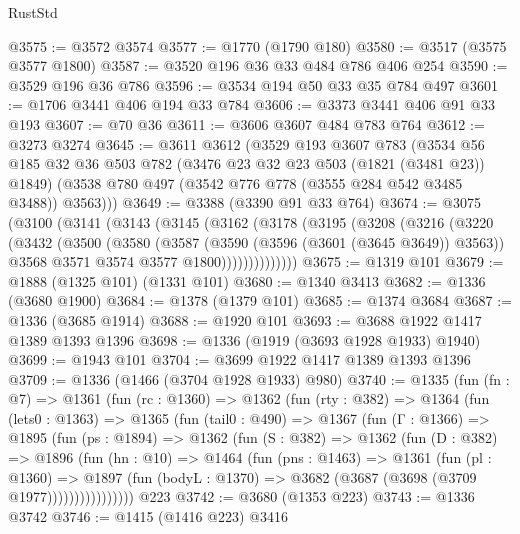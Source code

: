 \begin{lexlean}{RustStd}
\begin{coremodule}
{\begin{coremodule}
{{{{{{{{{{{{{{@3575 := @3572 @3574
@3577 := @1770 (@1790 @180)
@3580 := @3517 (@3575 @3577 @1800)
@3587 := @3520 @196 @36 @33 @484 @786 @406 @254
@3590 := @3529 @196 @36 @786
@3596 := @3534 @194 @50 @33 @35 @784 @497
@3601 := @1706 @3441 @406 @194 @33 @784
@3606 := @3373 @3441 @406 @91 @33 @193
@3607 := @70 @36
@3611 := @3606 @3607 @484 @783 @764
@3612 := @3273 @3274
@3645 := @3611
    @3612
    (@3529
      @193
      @3607
      @783
      (@3534
        @56
        @185
        @32
        @36
        @503
        @782
        (@3476 @23 @32 @23 @503 (@1821 (@3481 @23)) @1849)
        (@3538 @780 @497 (@3542 @776 @778 (@3555 @284 @542 @3485 @3488)) @3563)))
@3649 := @3388 (@3390 @91 @33 @764)
@3674 := @3075
    (@3100
      (@3141
        (@3143
          (@3145
            (@3162
              (@3178
                (@3195
                  (@3208
                    (@3216
                      (@3220
                        (@3432
                          (@3500
                            (@3580
                              (@3587
                                (@3590 (@3596 (@3601 (@3645 @3649)) @3563))
                                @3568
                                @3571
                                @3574
                                @3577
                                @1800))))))))))))))
@3675 := @1319 @101
@3679 := @1888 (@1325 @101) (@1331 @101)
@3680 := @1340 @3413
@3682 := @1336 (@3680 @1900)
@3684 := @1378 (@1379 @101)
@3685 := @1374 @3684
@3687 := @1336 (@3685 @1914)
@3688 := @1920 @101
@3693 := @3688 @1922 @1417 @1389 @1393 @1396
@3698 := @1336 (@1919 (@3693 @1928 @1933) @1940)
@3699 := @1943 @101
@3704 := @3699 @1922 @1417 @1389 @1393 @1396
@3709 := @1336 (@1466 (@3704 @1928 @1933) @980)
@3740 := @1335
    (fun (fn : @7) =>
    @1361
      (fun (rc : @1360) =>
      @1362
        (fun (rty : @382) =>
        @1364
          (fun (lets0 : @1363) =>
          @1365
            (fun (tail0 : @490) =>
            @1367
              (fun (Γ : @1366) =>
              @1895
                (fun (ps : @1894) =>
                @1362
                  (fun (S : @382) =>
                  @1362
                    (fun (D : @382) =>
                    @1896
                      (fun (hn : @10) =>
                      @1464
                        (fun (pns : @1463) =>
                        @1361
                          (fun (pl : @1360) =>
                          @1897
                            (fun (bodyL : @1370) => @3682 (@3687 (@3698 (@3709 @1977))))))))))))))))
    @223
@3742 := @3680 (@1353 @223)
@3743 := @1336 @3742
@3746 := @1415 (@1416 @223) @3416
}}}}}}}}}}}}}}
\end{coremodule}}
\end{coremodule}
\end{lexlean}
